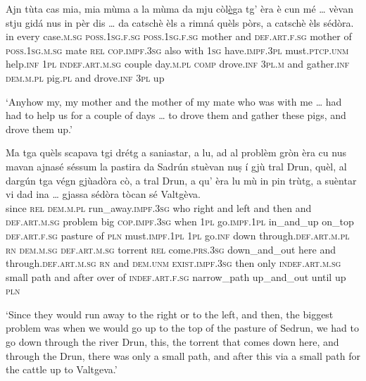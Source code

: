 \begin{linenumbers}
	\gll    Ajn tùta cas mia, mia mùma a la mùma da mju còl\underline{è}ga tg’ èra è cun mé … vèvan stju gidá nus in pèr dis … da catschè èls a rimná quèls pòrs, a catschè èls sédòra.\\
	in every case.\textsc{m.sg} \textsc{poss.1sg.f.sg}  \textsc{poss.1sg.f.sg} mother and \textsc{def.art.f.sg} mother of  \textsc{poss.1sg.m.sg} mate \textsc{rel}  \textsc{cop.impf.3sg} also with \textsc{1sg} {}  have.\textsc{impf.3pl} must.\textsc{ptcp.unm} help.\textsc{inf} \textsc{1pl} \textsc{indef.art.m.sg} couple day.\textsc{m.pl} {} \textsc{comp} drove.\textsc{inf} \textsc{3pl.m} and gather.\textsc{inf} \textsc{dem.m.pl} pig.\textsc{pl} and drove.\textsc{inf} \textsc{3pl} up\\
\end{linenumbers}
\medskip
\glt `Anyhow my, my mother and the mother of my mate who was with me … had had to help us for a couple of days … to drove them and gather these pigs, and drove them up.'
\medskip

\begin{linenumbers}
	\gll    Ma tga quèls scapava tgi drétg a saniastar, a lu, ad al problèm gròn èra cu nus mavan ajnasé séssum la pastira da Sadrún stuèvan nuṣ í gjù tral Drun, quèl, al dargún tga végn gjùadòra cò, a tral Drun, a qu’ èra lu mù in pin trùtg, a suèntar\footnotemark{} vi dad ina … gjassa sédòra tòcan sé Valtgèva. \\
	since \textsc{rel} \textsc{dem.m.pl} run\_away.\textsc{impf.3sg} who right and left and then and \textsc{def.art.m.sg} problem big  \textsc{cop.impf.3sg} when \textsc{1pl}  go.\textsc{impf.1pl} in\_and\_up on\_top \textsc{def.art.f.sg} pasture of \textsc{pln} must.\textsc{impf.1pl}  \textsc{1pl} go.\textsc{inf} down  through.\textsc{def.art.m.pl} \textsc{rn} \textsc{dem.m.sg} \textsc{def.art.m.sg} torrent \textsc{rel} come.\textsc{prs.3sg} down\_and\_out here and through.\textsc{def.art.m.sg} \textsc{rn} and \textsc{dem.unm} \textsc{exist.impf.3sg} then only \textsc{indef.art.m.sg} small path and after over of \textsc{indef.art.f.sg} {} narrow\_path up\_and\_out until up \textsc{pln}\\
\end{linenumbers}
\medskip
\glt `Since they would run away to the right or to the left, and then, the biggest problem was when we would go up to the top of the pasture of Sedrun, we had to go down through the river Drun, this, the torrent that comes down here, and through the Drun, there was only a small path, and after this via a small path for the cattle up to Valtgeva.'
\medskip

